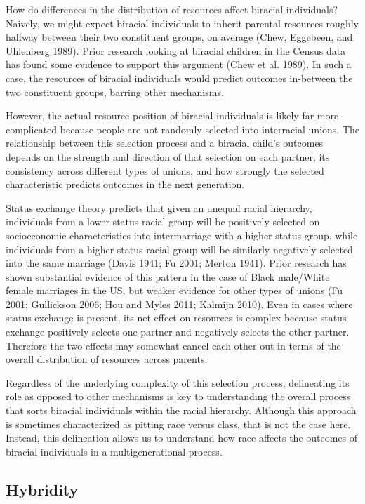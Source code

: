 \documentclass[
  letterpaper,
  DIV=11,
  numbers=noendperiod]{scrartcl}
\begin{document}
How do differences in the distribution of resources affect biracial
individuals? Naively, we might expect biracial individuals to inherit
parental resources roughly halfway between their two constituent groups,
on average (Chew, Eggebeen, and Uhlenberg 1989). Prior research looking
at biracial children in the Census data has found some evidence to
support this argument (Chew et al. 1989). In such a case, the resources
of biracial individuals would predict outcomes in-between the two
constituent groups, barring other mechanisms.

However, the actual resource position of biracial individuals is likely
far more complicated because people are not randomly selected into
interracial unions. The relationship between this selection process and
a biracial child's outcomes depends on the strength and direction of
that selection on each partner, its consistency across different types
of unions, and how strongly the selected characteristic predicts
outcomes in the next generation.

Status exchange theory predicts that given an unequal racial hierarchy,
individuals from a lower status racial group will be positively selected
on socioeconomic characteristics into intermarriage with a higher status
group, while individuals from a higher status racial group will be
similarly negatively selected into the same marriage (Davis 1941; Fu
2001; Merton 1941). Prior research has shown substantial evidence of
this pattern in the case of Black male/White female marriages in the US,
but weaker evidence for other types of unions (Fu 2001; Gullickson 2006;
Hou and Myles 2011; Kalmijn 2010). Even in cases where status exchange
is present, its net effect on resources is complex because status
exchange positively selects one partner and negatively selects the other
partner. Therefore the two effects may somewhat cancel each other out in
terms of the overall distribution of resources across parents.

Regardless of the underlying complexity of this selection process,
delineating its role as opposed to other mechanisms is key to
understanding the overall process that sorts biracial individuals within
the racial hierarchy. Although this approach is sometimes characterized
as pitting race versus class, that is not the case here. Instead, this
delineation allows us to understand how race affects the outcomes of
biracial individuals in a multigenerational process.

\hypertarget{hybridity}{%
\subsection{Hybridity}\label{hybridity}}
\end{document}
